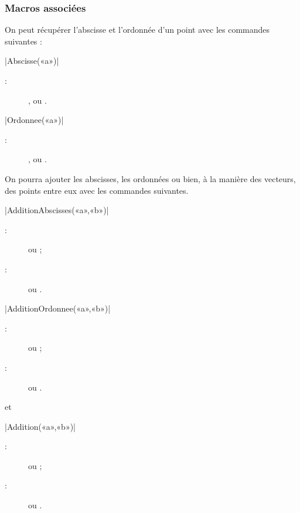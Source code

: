 \documentclass[a4paper,french]{article}
\begin{document}
\subsubsection{Macros associées}

On peut récupérer l'abscisse et l'ordonnée d'un point avec les commandes
suivantes :
\begin{colourband}
\macro|Abscisse(«a»)|
\begin{description}
  \item[:] ,  ou .
\end{description}
\end{colourband}

\begin{colourband}
\macro|Ordonnee(«a»)|
\begin{description}
  \item[:] ,  ou .
\end{description}
\end{colourband}

On pourra ajouter les abscisses, les ordonnées ou bien, à la manière des
vecteurs, des points entre eux avec les commandes suivantes.
\begin{colourband}
\macro|AdditionAbscisses(«a»,«b»)|
\begin{description}
  \item[:]  ou ;
  \item[:]  ou .
\end{description}
\end{colourband}
\begin{colourband}
\macro|AdditionOrdonnee(«a»,«b»)|
\begin{description}
  \item[:]  ou ;
  \item[:]  ou .
\end{description}
\end{colourband}
et
\begin{colourband}
\macro|Addition(«a»,«b»)|
\begin{description}
  \item[:]  ou ;
  \item[:]  ou .
\end{description}
\end{colourband}
\end{document}
